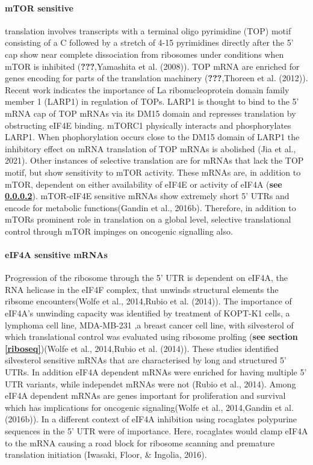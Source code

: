 \documentclass[12pt,openany]{book}
\begin{document}
\paragraph{mTOR sensitive}

translation involves transcripts with a terminal oligo pyrimidine (TOP)
motif consisting of a C followed by a stretch of 4-15 pyrimidines
directly after the 5' cap show near complete dissociation from ribosomes
under conditions when mTOR is inhibited ({\textbf{???}},Yamashita et al.
(2008)). TOP mRNA are enriched for genes encoding for parts of the
translation machinery ({\textbf{???}},Thoreen et al. (2012)). Recent
work indicates the importance of La ribonucleoprotein domain family
member 1 (LARP1) in regulation of TOPs. LARP1 is thought to bind to the
5' mRNA cap of TOP mRNAs via its DM15 domain and represses translation
by obstructing eIF4E binding. mTORC1 physically interacts and
phosphorylates LARP1. When phophorylation occurs close to the DM15
domain of LARP1 the inhibitory effect on mRNA translation of TOP mRNAs
is abolished (Jia et al., 2021). Other instances of selective
translation are for mRNAs that lack the TOP motif, but show sensitivity
to mTOR activity. These mRNAs are, in addition to mTOR, dependent on
either availability of eIF4E or activity of eIF4A (\textbf{see
\ref{eif4a}}). mTOR-eIF4E sensitive mRNAs show extremely short 5' UTRs
and encode for metabolic functions(Gandin et al., 2016b). Therefore, in
addition to mTORs prominent role in translation on a global level,
selective translational control through mTOR impinges on oncogenic
signalling also.

\paragraph{eIF4A sensitive mRNAs} \label{eif4a}

Progression of the ribosome through the 5' UTR is dependent on eIF4A,
the RNA helicase in the eIF4F complex, that unwinds structural elements
the ribsome encounters(Wolfe et al., 2014,Rubio et al. (2014)). The
importance of eIF4A's unwinding capacity was identified by treatment of
KOPT-K1 cells, a lymphoma cell line, MDA-MB-231 ,a breast cancer cell
line, with silvesterol of which translational control was evaluated
using ribosome prolfing (\textbf{see section \ref{riboseq}})(Wolfe et
al., 2014,Rubio et al. (2014)). These studies identified silvesterol
sensitive mRNAs that are characterised by long and structured 5' UTRs.
In addition eIF4A dependent mRNAs were enriched for having multiple 5'
UTR variants, while independet mRNAs were not (Rubio et al., 2014).
Among eIF4A dependent mRNAs are genes important for proliferation and
survival which has implications for oncogenic signaling(Wolfe et al.,
2014,Gandin et al. (2016b)). In a different context of eIF4A inhibition
using rocaglates polypurine sequences in the 5' UTR were of importance.
Here, rocaglates would clamp eIF4A to the mRNA causing a road block for
ribosome scanning and premature translation initiation (Iwasaki, Floor,
\& Ingolia, 2016).
\end{document}
